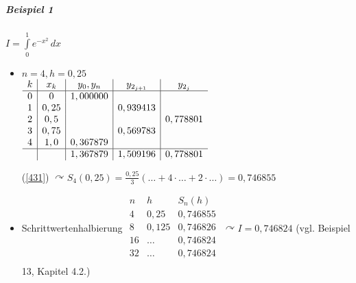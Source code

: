 \documentclass[a4paper]{scrartcl}
\begin{document}
\subparagraph{Beispiel 1} $I = \int\limits_0^1 e^{-x^2} \, dx$
\begin{itemize}
\item $n= 4, h=0,25$\\
$\begin{array}{c|c|c|c|c}
k & x_k & y_0,y_n & y_{2_{j+1}} & y_{2_j}\\ \hline
0 & 0 & 1,000000 & \\
1 & 0,25 & & 0,939413 \\
2 & 0,5 & & &0,778801\\
3 & 0,75 & & 0,569783 \\
4 & 1,0 & 0,367879 &  \\ \hline
 & & 1,367879 & 1,509196 & 0,778801\\
\end{array}$

(\ref{431}) $\curvearrowright S_4(0,25) = \frac{0,25}{3} (\dots + 4 \cdot \dots + 2 \cdot \dots) = 0,746855$

\item Schrittwertenhalbierung
$\begin{array}{c|c|c}
n & h & S_n(h)\\ \hline
4 & 0,25 & 0,746855\\
8 & 0,125 & 0,746826\\
16 & \dots & 0,746824 \\
32 & \dots & 0,746824\\
\end{array}$
$\curvearrowright I = 0,746824$ (vgl. Beispiel 13, Kapitel 4.2.)
\end{itemize}
\end{document}
